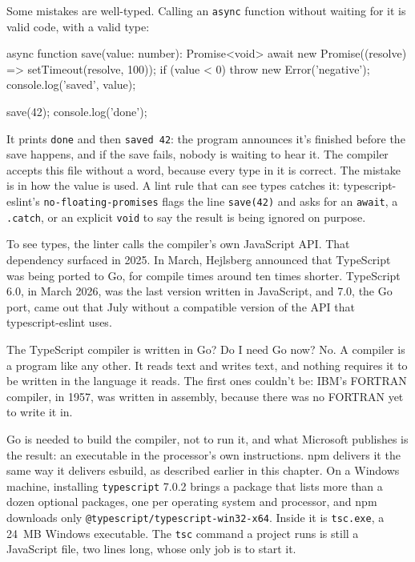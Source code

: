 Some mistakes are well-typed. Calling an \texttt{async} function without
waiting for it is valid code, with a valid type:

\begin{code}
async function save(value: number): Promise<void> {
  await new Promise((resolve) => setTimeout(resolve, 100));
  if (value < 0) throw new Error('negative');
  console.log('saved', value);
}

save(42);
console.log('done');
\end{code}

It prints \texttt{done} and then \texttt{saved 42}: the program announces
it's finished before the save happens, and if the save fails, nobody is waiting
to hear it. The compiler accepts this file without a word, because every type
in it is correct. The mistake is in how the value is used. A lint rule that can
see types catches it: typescript-eslint's \texttt{no-floating-promises} flags
the line \texttt{save(42)} and asks for an \texttt{await}, a \texttt{.catch}, or
an explicit \texttt{void} to say the result is being ignored on purpose.

To see types, the linter calls the compiler's own JavaScript API. That
dependency surfaced in 2025. In March, Hejlsberg announced that TypeScript was
being ported to Go, for compile times around ten times shorter. TypeScript 6.0,
in March 2026, was the last version written in JavaScript, and 7.0, the Go
port, came out that July without a compatible version of the API that
typescript-eslint uses.

\begin{question}{The TypeScript compiler is written in Go? Do I need Go now?}
No. A compiler is a program like any other. It reads text and writes text, and
nothing requires it to be written in the language it reads. The first ones
couldn't be: IBM's FORTRAN compiler, in 1957, was written in assembly, because
there was no FORTRAN yet to write it in.

Go is needed to build the compiler, not to run it, and what Microsoft publishes
is the result: an executable in the processor's own instructions. npm delivers
it the same way it delivers esbuild, as described earlier in this chapter. On a
Windows machine, installing \texttt{typescript} 7.0.2 brings a package that
lists more than a dozen optional packages, one per operating system and
processor, and npm downloads only \texttt{@typescript/typescript-win32-x64}.
Inside it is \texttt{tsc.exe}, a 24~MB Windows executable. The \texttt{tsc}
command a project runs is still a JavaScript file, two lines long, whose only
job is to start it.
\end{question}

